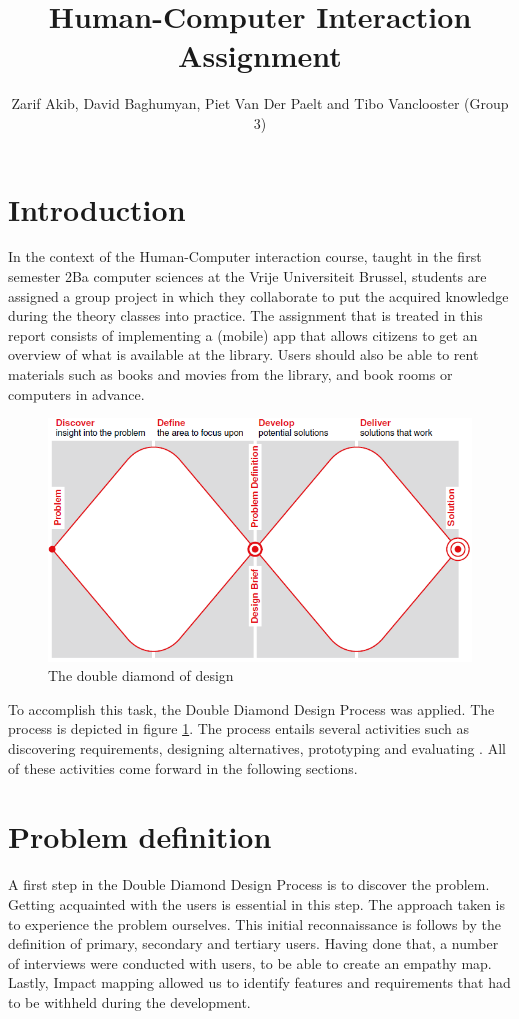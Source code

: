 \documentclass[a4paper, 11pt]{article}
\title{Human-Computer Interaction Assignment}
\author{Zarif Akib, David Baghumyan, Piet Van Der Paelt and Tibo Vanclooster (Group 3)}
\begin{document}
\maketitle
\tableofcontents
\listoffigures



\section{Introduction}\label{intro}
In the context of the Human-Computer interaction course, taught in the first semester 2Ba computer sciences at the Vrije Universiteit Brussel, students are assigned a group project in which they collaborate to put the acquired knowledge during the theory classes into practice. The assignment that is treated in this report consists of implementing a (mobile) app that allows citizens to get an overview of what is available at the library. Users should also be able to rent materials such as books and movies from the library, and book rooms or computers in advance.\\
\begin{figure}[h]
	\centering
	\includegraphics[width=0.6\linewidth]{figures/DoubleDiamond}
	\caption{The double diamond of design\cite{doubleD}}
	\label{fig:doublediamond}
\end{figure}


To accomplish this task, the Double Diamond Design Process was applied. The process is depicted in figure \ref{fig:doublediamond}. The process entails several activities such as discovering requirements, designing alternatives, prototyping and evaluating \cite{sharp2023interaction}. All of these activities come forward in the following sections.

\section{Problem definition}
A first step in the Double Diamond Design Process is to discover the problem. Getting acquainted with the users is essential in this step. The approach taken is to experience the problem ourselves. This initial reconnaissance is follows by the definition of primary, secondary and tertiary users. Having done that, a number of interviews were conducted with users, to be able to create an empathy map. Lastly, Impact mapping allowed us to identify features and requirements that had to be withheld during the development.
\end{document}

